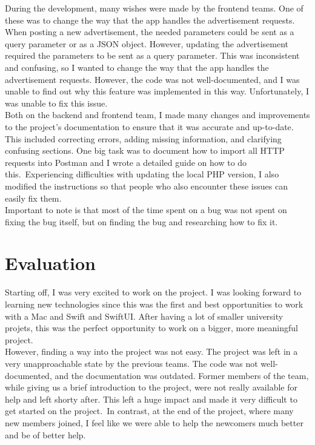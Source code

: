 \documentclass[sf-font,usefira,english]{uulm/sp/article}
\begin{document}
During the development, many wishes were made by the frontend teams.
One of these was to change the way that the app handles the advertisement
requests.
When posting a new advertisement, the needed parameters could be sent
as a query parameter or as a JSON object. 
However, updating the advertisement required the parameters to be sent
as a query parameter.
This was inconsistent and confusing, so I wanted to change the way that the app
handles the advertisement requests.
However, the code was not well-documented, and I was unable to find
out why this feature was implemented in this way.
Unfortunately, I was unable to fix this issue.\\

Both on the backend and frontend team,
I made many changes and improvements to the project's 
documentation to ensure that it was accurate and up-to-date. 
This included correcting errors, adding missing information, and clarifying confusing sections.
One big task was to document how to import all HTTP requests into Postman
and I wrote a detailed guide on how to do this.\
Experiencing difficulties with updating the local PHP version,
I also modified the instructions so that people who also encounter
these issues can easily fix them.\\

Important to note is that most of the time spent on a bug
was not spent on fixing the bug itself, but on finding the bug
and researching how to fix it.\\

\section{Evaluation}

Starting off, I was very excited to work on the project.
I was looking forward to learning new technologies since this was
the first and best opportunities to work with a Mac and Swift and SwiftUI.
After having a lot of smaller university projets, this was the perfect opportunity
to work on a bigger, more meaningful project.\\

However, finding a way into the project was not easy.
The project was left in a very unapproachable state by the previous teams.
The code was not well-documented, and the documentation was outdated.
Former members of the team, while giving us a brief introduction to the project,
were not really available for help and left shorty after. 
This left a huge impact and made it very difficult to get started on the project.\
In contrast, at the end of the project, where many new members joined, 
I feel like we were able to help the newcomers much better and be of better help.\\
\end{document}
